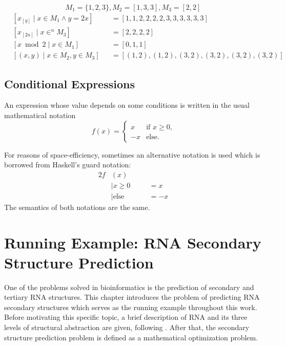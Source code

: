 \documentclass[
    a4paper,
    12pt,
    twoside,
    BCOR=12mm,
    parskip=half,
    chapterprefix,
    numbers=noenddot,
    bibliography=totoc
]{scrbook}
\begin{document}
\begin{example}
	\begin{equation*}
		M_1 = \{1,2,3\}, M_2 = [1,3,3], M_3 = [2,2]
	\end{equation*}
	\begin{align*}
		&[x_{[y]} \mid x \in M_1 \wedge y=2x] &&= [1,1,2,2,2,2,3,3,3,3,3,3]\\
		&[x_{[2n]} \mid x \in^n M_3] &&= [2,2,2,2]\\
		&[x \bmod 2 \mid x \in M_1] &&= [0,1,1]\\
		&[(x,y) \mid x \in M_2, y \in M_3] &&= [(1,2),(1,2),(3,2),(3,2),(3,2),(3,2)]
	\end{align*}
\end{example}

\section{Conditional Expressions}

An expression whose value depends on some conditions is written in the usual mathematical notation
\[
f(x)= \begin{cases}
	x  &\text{if $x \geq 0$,}\\
	-x &\text{else.}
\end{cases}
\]

For reasons of space-efficiency, sometimes an alternative notation is used which is borrowed from Haskell's guard notation:
\begin{alignat*}{2}
	f&(x) \\
	&\mid x \geq 0 &&\quad= x\\
	&\mid \text{else} &&\quad= -x
\end{alignat*}
The semantics of both notations are the same.

\chapter{Running Example: RNA Secondary Structure Prediction}
\label{ch:running_ex}

One of the problems solved in \gls{bioinformatics} is the prediction of secondary and tertiary \gls{RNA} structures. This chapter introduces the problem of predicting \gls{RNA} secondary structures which serves as the running example throughout this work. Before motivating this specific topic, a brief description of \gls{RNA} and its three levels of structural abstraction are given, following \citet{meyers_rna_2000}. After that, the secondary structure prediction problem is defined as a mathematical optimization problem.
\end{document}
